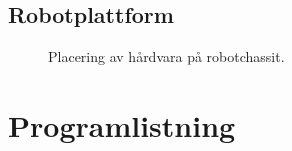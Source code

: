 \documentclass[a4paper,11pt]{article}
\begin{document}
\begin{appendices}
\section{Robotplattform}
\label{app:placement}
\begin{figure}[h!]
    \caption{Placering av hårdvara på robotchassit.}
    \label{fig:placement}
\end{figure}
\end{appendices}

\clearpage
\section{Programlistning}



\clearpage
{} %
\printbibliography
\end{document}

